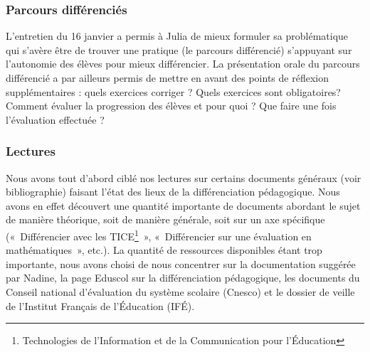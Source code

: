 

\subsubsection{Parcours différenciés}

L'entretien du 16 janvier a permis à Julia de mieux formuler sa problématique qui s’avère être de trouver une pratique (le parcours différencié) s’appuyant sur l’autonomie des élèves pour mieux différencier. La présentation orale du parcours différencié a par ailleurs permis de mettre en avant des points de réflexion supplémentaires : quels exercices corriger ? Quels exercices sont obligatoires? Comment évaluer la progression des élèves et pour quoi ? Que faire une fois l’évaluation effectuée ?

\subsubsection{Lectures}

Nous avons tout d’abord ciblé nos lectures sur certains documents généraux (voir bibliographie) faisant l’état des lieux de la différenciation pédagogique. Nous avons en effet découvert une quantité importante de documents abordant le sujet de manière théorique, soit de manière générale, soit sur un axe spécifique (« Différencier avec les TICE\footnote{Technologies de l'Information et de la Communication pour l'Éducation} », « Différencier sur une évaluation en mathématiques », etc.). La quantité de ressources disponibles étant trop importante, nous avons choisi de nous concentrer sur la documentation suggérée par Nadine, la page Eduscol sur la différenciation pédagogique, les documents du Conseil national d’évaluation du système scolaire (Cnesco) et le dossier de veille de l’Institut Français de l’Éducation (IFÉ).

